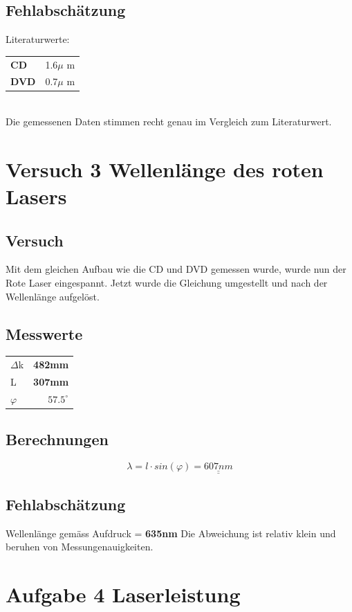 \documentclass{article}
\begin{document}
\subsection{Fehlabschätzung}
Literaturwerte:\\

\begin{tabular}{l r}
\textbf{CD}& 1.6$\mu$ m\\
\textbf{DVD}	&0.7$\mu$ m\\
	
\end{tabular}
\vspace{3mm}\\
Die gemessenen Daten stimmen recht genau im Vergleich zum Literaturwert.
\newpage
\section{Versuch 3 Wellenlänge des roten Lasers}
\subsection{Versuch}
Mit dem gleichen Aufbau wie die CD und DVD gemessen wurde, wurde nun der Rote Laser eingespannt.
Jetzt wurde die Gleichung umgestellt und nach der Wellenlänge aufgelöst.
\subsection{Messwerte}
\begin{tabular}{l r}
	$\Delta$k & \textbf{482mm}\\
	L & \textbf{307mm}\\
	$\varphi$ & $57.5^\circ$
\end{tabular}
\subsection{Berechnungen}
\begin{equation}
\lambda = l \cdot sin(\varphi) = \underline{\underline{607nm}}
\end{equation}
\subsection{Fehlabschätzung}
Wellenlänge gemäss Aufdruck = \textbf{635nm}
 Die Abweichung ist relativ klein und beruhen von Messungenauigkeiten.
 \newpage
 \section{Aufgabe 4 Laserleistung}
\end{document}
